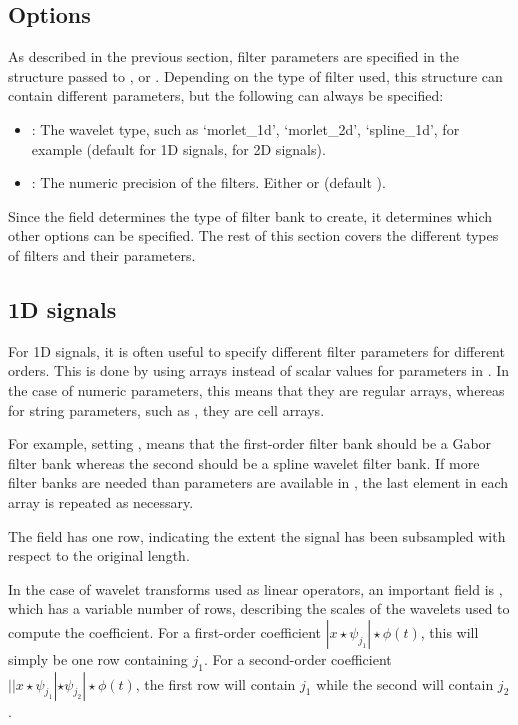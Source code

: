 \documentclass{article}
\begin{document}
\subsection{Options \label{sub:filters-options}}


As described in the previous section, filter parameters are specified in the  structure passed to ,  or . Depending on the type of filter used, this structure can contain different parameters, but the following can always be specified:
\begin{itemize}
	\item {}: The wavelet type, such as `morlet\_1d', `morlet\_2d', `spline\_1d', for example (default  for 1D signals,  for 2D signals).
	\item {}: The numeric precision of the filters. Either  or  (default ).
\end{itemize}
Since the  field determines the type of filter bank to create, it determines which other options can be specified. The rest of this section covers the different types of filters and their parameters.
\subsection{1D signals}
For 1D signals, it is often useful to specify different filter parameters for different orders. This is done by using arrays instead of scalar values for parameters in . In the case of numeric parameters, this means that they are regular arrays, whereas for string parameters, such as , they are cell arrays.

For example, setting , means that the first-order filter bank should be a Gabor filter bank whereas the second should be a spline wavelet filter bank. If more filter banks are needed than parameters are available in , the last element in each array is repeated as necessary.

The  field has one row, indicating the extent the signal has been subsampled with respect to the original length.

In the case of wavelet transforms used as linear operators, an important field is , which has a variable number of rows, describing the scales of the wavelets used to compute the coefficient. For a first-order coefficient $|x\star\psi_{j_1}|\star\phi(t)$, this will simply be one row containing $j_1$. For a second-order coefficient $||x\star\psi_{j_1}|\star\psi_{j_2}|\star\phi(t)$, the first row will contain $j_1$ while the second will contain $j_2$.
\end{document}
